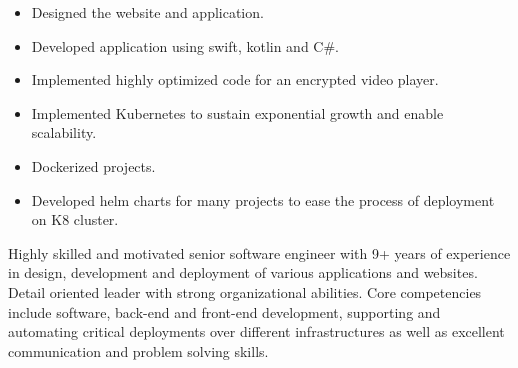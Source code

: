 \documentclass[10pt,a4paper,ragged2e,withhyper]{altacv}
\begin{document}
\begin{paracol}{2}
\divider

\begin{itemize}
\item Designed the website and application.
\item Developed application using swift, kotlin and C\#.
\item Implemented highly optimized code for an encrypted video player.
\end{itemize}

\divider

\begin{itemize}
\item Implemented Kubernetes to sustain exponential growth and enable scalability.
\item Dockerized projects.
\item Developed helm charts for many projects to ease the process of deployment on K8 cluster.
\end{itemize}


\medskip

\newpage




\switchcolumn


\begin{multiline}
Highly skilled and motivated senior software engineer with 9+ years of experience in design, development and deployment of various applications and websites. Detail oriented leader with strong organizational abilities. Core competencies include software, back-end and front-end development, supporting and automating critical deployments over different infrastructures as well as excellent communication and problem solving skills. 
\end{multiline}


\\

\divider\smallskip



\end{paracol}
\end{document}
